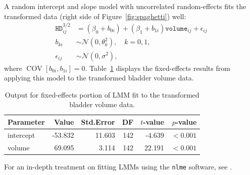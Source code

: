 \documentclass{article}\usepackage[]{graphicx}\usepackage[]{color}
\newcommand{\COV}{\operatorname{COV}}
\begin{document}
A random intercept and slope model with uncorrelated random-effects fits the transformed data (right side of Figure~\ref{fig:spaghetti}) well:
\begin{align*}
  \texttt{HD}^{3/2}_{ij} &= \left(\beta_0 + b_{0i}\right) + \left(\beta_1 + b_{1i}\right)\texttt{volume}_{ij} + \epsilon_{ij} \\
  b_{ki} &\sim \mathcal{N}\left(0, \theta_k^2\right), \quad k = 0, 1, \\
  \epsilon_{ij} &\sim \mathcal{N}\left(0, \sigma^2\right),
\end{align*}
where $\COV\left[b_{0i}, b_{1i}\right] = 0$.  Table~\ref{tab:transformed-lmm} displays the fixed-effects results from applying this model to the transformed bladder volume data. %



\begin{table}
\begin{tabular}{lrrrrr}
  \hline
  Parameter & Value   & Std.Error & DF  & $t$-value & $p$-value\\
  \hline
  intercept & -53.832 & 11.603    & 142 & -4.639    & $<0.001$\\
  volume    & 69.095  & 3.114     & 142 & 22.191    & $<0.001$\\
  \hline
  \end{tabular}
  \caption{Output for fixed-effects portion of LMM fit to the transformed bladder volume data.} 
  \label{tab:transformed-lmm}
\end{table}

For an in-depth treatment on fitting LMMs using the \texttt{nlme} software, see \citet{pinheiro-mixed-2000}.
\end{document}
